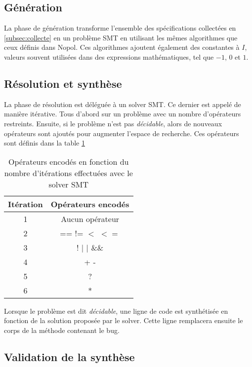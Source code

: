 \subsection{Génération}
\par La phase de génération transforme l'ensemble des spécifications collectées en \ref{subsec:collecte} en un problème SMT en utilisant les mêmes algorithmes que ceux définis dans Nopol\cite{nopol}. Ces algorithmes ajoutent également des constantes à $I$, valeurs souvent utilisées dans des expressions mathématiques, tel que $-1$, $0$ et $1$. 
\subsection{Résolution et synthèse}
\label{subsec:synthese}
\par La phase de résolution est déléguée à un solver SMT. Ce dernier est appelé de manière itérative. Tous d'abord sur un problème avec un nombre d'opérateurs restreints. Ensuite, si le problème n'est pas \textit{décidable}, alors de nouveaux opérateurs sont ajoutés pour augmenter l'espace de recherche. Ces opérateurs sont définis dans la table \ref{table:operators}


\begin{table}[H]
\centering
\begin{tabular}{|c|c|}
  \hline
  Itération & Opérateurs encodés \\
  \hline
  1 & Aucun opérateur  \\
  2 & == != $<$ $<=$   \\
  3 & ! $|$ $|$ \&\&  \\
  4 & + -  \\
  5 & ?  \\
  6 & *  \\
  \hline
\end{tabular}

\caption{Opérateurs encodés en fonction du nombre d'itérations effectuées avec le solver SMT}
\label{table:operators}
\end{table}

\par Lorsque le problème est dit \textit{décidable}, une ligne de code est synthétisée en fonction de la solution proposée par le solver. Cette ligne remplacera ensuite le corps de la méthode contenant le bug.

\subsection{Validation de la synthèse}

